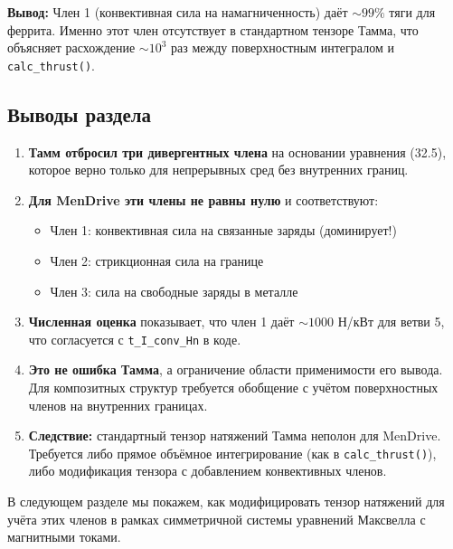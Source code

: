 \documentclass[a4paper,12pt]{article}
\begin{document}
\textbf{Вывод:} Член 1 (конвективная сила на намагниченность) даёт
$\sim 99\%$ тяги для феррита. Именно этот член отсутствует в стандартном
тензоре Тамма, что объясняет расхождение $\sim 10^3$ раз между поверхностным
интегралом и \texttt{calc\_thrust()}.

\subsection{Выводы раздела}

\begin{enumerate}
    \item \textbf{Тамм отбросил три дивергентных члена} на основании
    уравнения (32.5), которое верно только для непрерывных сред без
    внутренних границ.

    \item \textbf{Для MenDrive эти члены не равны нулю} и соответствуют:
    \begin{itemize}
        \item Член 1: конвективная сила на связанные заряды (доминирует!)
        \item Член 2: стрикционная сила на границе
        \item Член 3: сила на свободные заряды в металле
    \end{itemize}

    \item \textbf{Численная оценка} показывает, что член 1 даёт $\sim 1000$ Н/кВт
    для ветви 5, что согласуется с \texttt{t\_I\_conv\_Hn} в коде.

    \item \textbf{Это не ошибка Тамма}, а ограничение области применимости
    его вывода. Для композитных структур требуется обобщение с учётом
    поверхностных членов на внутренних границах.

    \item \textbf{Следствие:} стандартный тензор натяжений Тамма неполон
    для MenDrive. Требуется либо прямое объёмное интегрирование (как в
    \texttt{calc\_thrust()}), либо модификация тензора с добавлением
    конвективных членов.
\end{enumerate}

В следующем разделе мы покажем, как модифицировать тензор натяжений для
учёта этих членов в рамках симметричной системы уравнений Максвелла с
магнитными токами.




\end{document}
